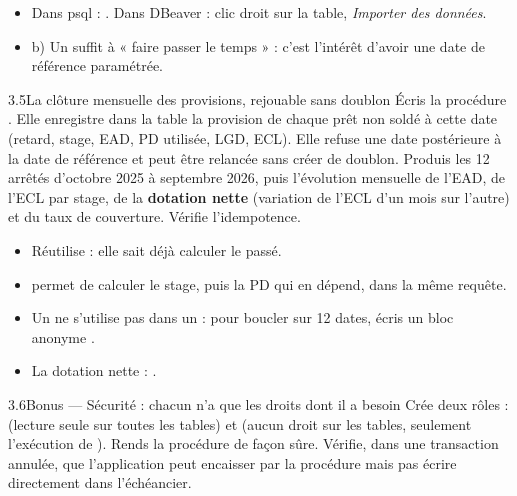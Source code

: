 \begin{indice}
\begin{itemize}
\item Dans psql : . Dans DBeaver :
clic droit sur la table, \emph{Importer des données}.
\item b) Un  suffit à « faire passer le temps » : c'est l'intérêt d'avoir
une date de référence paramétrée.
\end{itemize}
\end{indice}

\begin{exercice}{3.5}{La clôture mensuelle des provisions, rejouable sans doublon}
Écris la procédure . Elle enregistre dans la table
 la provision de chaque prêt non soldé à cette date (retard, stage, EAD, PD utilisée, LGD, ECL). Elle
refuse une date postérieure à la date de référence et peut être relancée sans créer de doublon.
Produis les 12 arrêtés d'octobre 2025 à septembre 2026, puis l'évolution mensuelle de l'EAD, de l'ECL
par stage, de la \textbf{dotation nette} (variation de l'ECL d'un mois sur l'autre) et du taux de
couverture. Vérifie l'idempotence.
\end{exercice}

\begin{indice}
\begin{itemize}
\item Réutilise  : elle sait déjà calculer le passé.
\item {} permet de calculer le stage, puis la PD qui en dépend, dans
la même requête.
\item Un  ne s'utilise pas dans un  : pour boucler sur 12 dates, écris un bloc
anonyme .
\item La dotation nette : .
\end{itemize}
\end{indice}

\begin{exercice}{3.6}{Bonus --- Sécurité : chacun n'a que les droits dont il a besoin}
Crée deux rôles :  (lecture seule sur toutes les tables) et
 (aucun droit sur les tables, seulement l'exécution de
). Rends la procédure  de façon sûre. Vérifie, dans
une transaction annulée, que l'application peut encaisser par la procédure mais pas écrire directement
dans l'échéancier.
\end{exercice}

